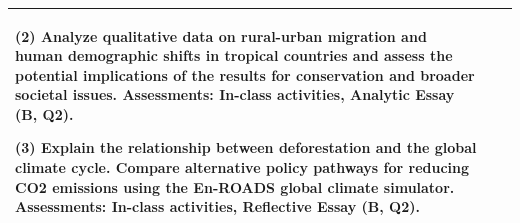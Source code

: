 \documentclass[
  10pt,
  letterpaper,
  oneside,
  open=any]{scrbook}
\begin{document}
\begin{tabular}[t]{>{\raggedright\arraybackslash}p{25em}>{\raggedright\arraybackslash}p{25em}l}
(2) Analyze qualitative data on rural-urban migration and human demographic shifts in tropical countries and assess the potential implications of the results for conservation and broader societal issues. Assessments: In-class activities, Analytic Essay (B, Q2). 

(3) Explain the relationship between deforestation and the global climate cycle. Compare alternative policy pathways for reducing CO2 emissions using the En-ROADS global climate simulator. Assessments: In-class activities, Reflective Essay (B, Q2). & \cellcolor{white}{\textcolor{black}{}}\\
\bottomrule
\end{tabular}


\backmatter
\end{document}
